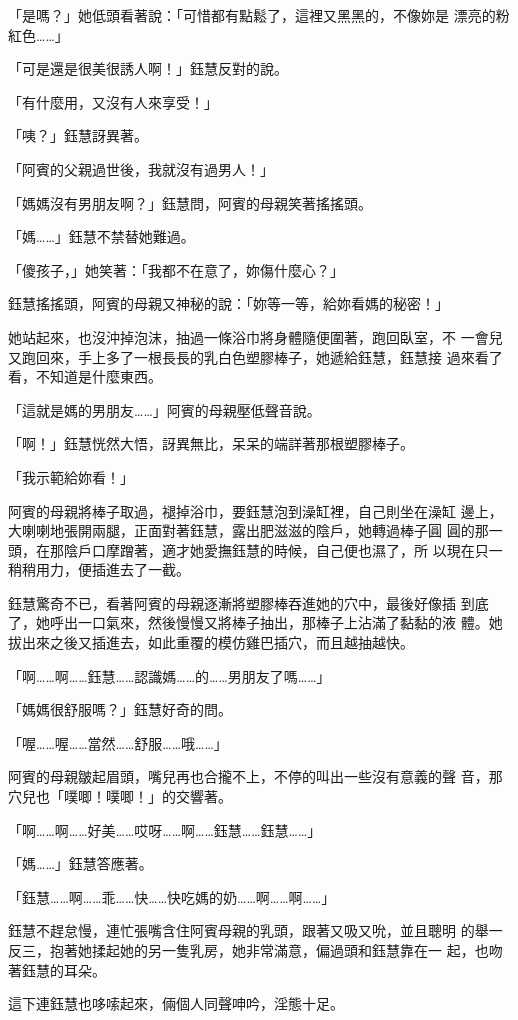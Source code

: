 「是嗎？」她低頭看著說：「可惜都有點鬆了，這裡又黑黑的，不像妳是
漂亮的粉紅色……」

「可是還是很美很誘人啊！」鈺慧反對的說。

「有什麼用，又沒有人來享受！」

「咦？」鈺慧訝異著。

「阿賓的父親過世後，我就沒有過男人！」

「媽媽沒有男朋友啊？」鈺慧問，阿賓的母親笑著搖搖頭。

「媽……」鈺慧不禁替她難過。

「傻孩子，」她笑著：「我都不在意了，妳傷什麼心？」

鈺慧搖搖頭，阿賓的母親又神秘的說：「妳等一等，給妳看媽的秘密！」

她站起來，也沒沖掉泡沫，抽過一條浴巾將身體隨便圍著，跑回臥室，不
一會兒又跑回來，手上多了一根長長的乳白色塑膠棒子，她遞給鈺慧，鈺慧接
過來看了看，不知道是什麼東西。

「這就是媽的男朋友……」阿賓的母親壓低聲音說。

「啊！」鈺慧恍然大悟，訝異無比，呆呆的端詳著那根塑膠棒子。

「我示範給妳看！」

阿賓的母親將棒子取過，褪掉浴巾，要鈺慧泡到澡缸裡，自己則坐在澡缸
邊上，大喇喇地張開兩腿，正面對著鈺慧，露出肥滋滋的陰戶，她轉過棒子圓
圓的那一頭，在那陰戶口摩蹭著，適才她愛撫鈺慧的時候，自己便也濕了，所
以現在只一稍稍用力，便插進去了一截。

鈺慧驚奇不已，看著阿賓的母親逐漸將塑膠棒吞進她的穴中，最後好像插
到底了，她呼出一口氣來，然後慢慢又將棒子抽出，那棒子上沾滿了黏黏的液
體。她拔出來之後又插進去，如此重覆的模仿雞巴插穴，而且越抽越快。

「啊……啊……鈺慧……認識媽……的……男朋友了嗎……」

「媽媽很舒服嗎？」鈺慧好奇的問。

「喔……喔……當然……舒服……哦……」

阿賓的母親皺起眉頭，嘴兒再也合攏不上，不停的叫出一些沒有意義的聲
音，那穴兒也「噗唧！噗唧！」的交響著。

「啊……啊……好美……哎呀……啊……鈺慧……鈺慧……」

「媽……」鈺慧答應著。

「鈺慧……啊……乖……快……快吃媽的奶……啊……啊……」

鈺慧不趕怠慢，連忙張嘴含住阿賓母親的乳頭，跟著又吸又吮，並且聰明
的舉一反三，抱著她揉起她的另一隻乳房，她非常滿意，偏過頭和鈺慧靠在一
起，也吻著鈺慧的耳朵。

這下連鈺慧也哆嗦起來，倆個人同聲呻吟，淫態十足。

